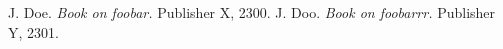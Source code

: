 \documentclass[twoside]{ctuthesis}
\begin{document}
    \maketitle
    
    
    
    
    

    
    \begin{thebibliography}{doe}

         J. Doe. \emph{Book on foobar.} Publisher X, 2300.
         J. Doo. \emph{Book on foobarrr.} Publisher Y, 2301.
    \end{thebibliography}
\end{document}
